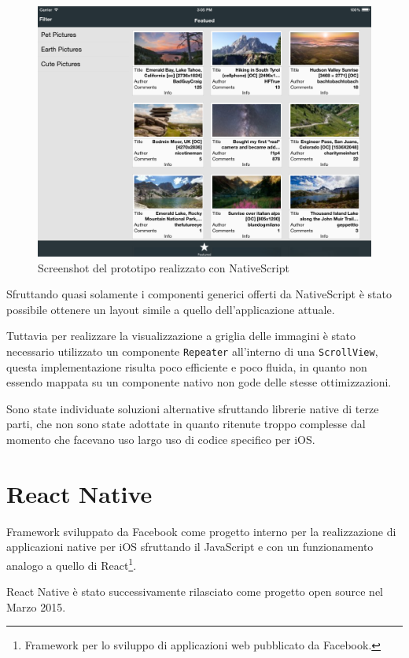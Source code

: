 \begin{figure}[htp]
\centering
\includegraphics[width=\textwidth]{../immagini/prototipo-react-native}
\caption{Screenshot del prototipo realizzato con NativeScript}  
\end{figure}

Sfruttando quasi solamente i componenti generici offerti da NativeScript è stato possibile ottenere un layout simile a quello dell'applicazione attuale.

Tuttavia per realizzare la visualizzazione a griglia delle immagini è stato necessario utilizzato un componente \texttt{Repeater} all'interno di una \texttt{ScrollView}, questa implementazione risulta poco efficiente e poco fluida, in quanto non essendo mappata su un componente nativo non gode delle stesse ottimizzazioni.

Sono state individuate soluzioni alternative sfruttando librerie native di terze parti, che non sono state adottate in quanto ritenute troppo complesse dal momento che facevano uso largo uso di codice specifico per iOS.

\FloatBarrier
\section{React Native}

Framework sviluppato da Facebook come progetto interno per la realizzazione di applicazioni native per iOS sfruttando il JavaScript e con un funzionamento analogo a quello di React\footnote{Framework per lo sviluppo di applicazioni web pubblicato da Facebook.}.

React Native è stato successivamente rilasciato come progetto open source nel Marzo 2015.


